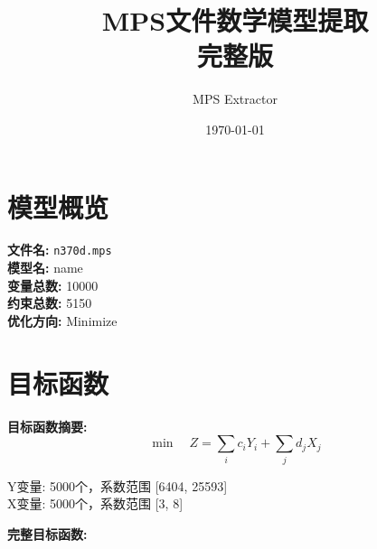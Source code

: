\documentclass[a4paper,10pt]{article}
\title{MPS文件数学模型提取\\{\large 完整版}}
\author{MPS Extractor}
\date{\today}
\begin{document}
\maketitle
\tableofcontents
\newpage

\section{模型概览}

\textbf{文件名:} \texttt{n370d.mps} \\
\textbf{模型名:} name \\
\textbf{变量总数:} 10000 \\
\textbf{约束总数:} 5150 \\
\textbf{优化方向:} Minimize \\

\section{目标函数}

\textbf{目标函数摘要:}
\begin{equation}
\min \quad Z = \sum_{i} c_i Y_i + \sum_{j} d_j X_j
\end{equation}

Y变量: 5000个，系数范围 [6404, 25593] \\
X变量: 5000个，系数范围 [3, 8]

\textbf{完整目标函数:}
\end{document}
